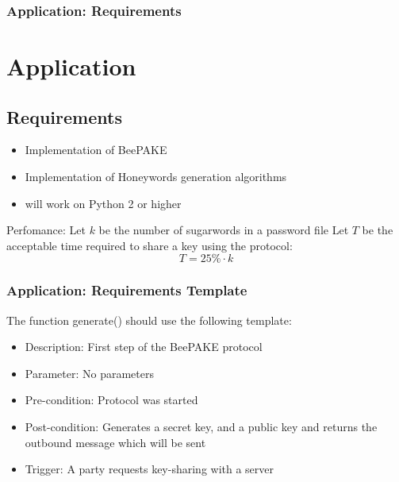 \documentclass[9pt]{beamer}
\begin{document}
\begin{frame}
\frametitle{Application: Requirements}
\section{Application}
\subsection{Requirements}
\begin{itemize}
\item Implementation of BeePAKE
\item Implementation of Honeywords generation algorithms
\item will work on Python 2 or higher
\end{itemize}
	Perfomance: Let \(k\) be the number of sugarwords in a password file
	Let \(T\) be the acceptable time required to share a key using the
	protocol:
	\[T = 25\% \cdot k\]
\end{frame}

\begin{frame}
\frametitle{Application: Requirements Template}
The function generate() should use the following template:
\begin{itemize}
	\item Description: First step of the BeePAKE protocol
	\item Parameter: No parameters
	\item Pre-condition: Protocol was started
	\item Post-condition: Generates a secret key, and a public key and returns the outbound message which will be sent
	\item Trigger: A party requests key-sharing with a server
\end{itemize}
\end{frame}
\end{document}
